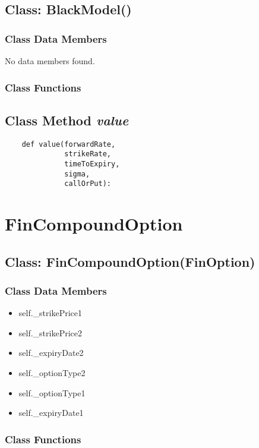 \documentclass[twoside,11pt]{book}
\begin{document}
\subsection{Class: BlackModel()}


\subsubsection{Class Data Members}
No data members found.

\subsubsection{Class Functions}

\subsection{Class Method {\it value}}


\begin{lstlisting}
    def value(forwardRate,
              strikeRate,
              timeToExpiry,
              sigma,
              callOrPut):
\end{lstlisting}

\newpage
\section{FinCompoundOption}

\subsection{Class: FinCompoundOption(FinOption)}


\subsubsection{Class Data Members}
\begin{itemize}
\item{self.\_strikePrice1}
\item{self.\_strikePrice2}
\item{self.\_expiryDate2}
\item{self.\_optionType2}
\item{self.\_optionType1}
\item{self.\_expiryDate1}
\end{itemize}

\subsubsection{Class Functions}
\end{document}
